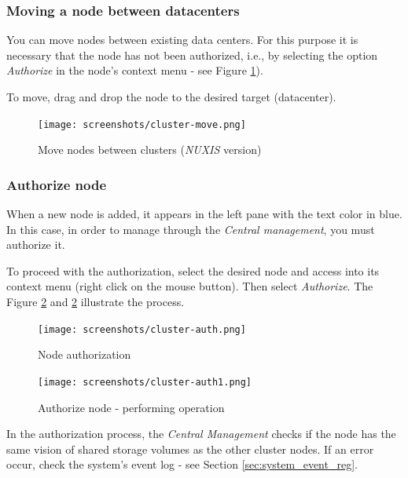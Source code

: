 {\subsubsection{Moving a node between datacenters}
You can move nodes between existing data centers. For this purpose it is necessary that the node has not been authorized, i.e., by selecting the option \emph{Authorize} in the node's context menu - see Figure \ref{fig:cluster-move}).

To move, drag and drop the node to the desired target (datacenter).
\begin{figure}[H]
        \begin{center}
        \texttt{[image: screenshots/cluster-move.png]}
        \caption{Move nodes between clusters (\emph{NUXIS} version)}
        \label{fig:cluster-move}
        \end{center}
\end{figure}

\subsubsection{Authorize node}
When a new node is added, it appears in the left pane with the text color in blue. In this case, in order to manage through the \textit{Central management}, you must authorize it.

To proceed with the authorization, select the desired node and access into its context menu (right click on the mouse button). Then select \textit{Authorize}. The Figure \ref{fig:cluster-auth} and \ref{fig:cluster-auth} illustrate the process.

\begin{figure}[H]
        \begin{center}
        \texttt{[image: screenshots/cluster-auth.png]}
        \caption{Node authorization}
        \label{fig:cluster-auth}
        \end{center}
\end{figure}

\begin{figure}[H]
        \begin{center}
        \texttt{[image: screenshots/cluster-auth1.png]}
        \caption{Authorize node - performing operation}
        \label{fig:cluster-auth1}
        \end{center}
\end{figure}
In the authorization process, the \textit{Central Management} checks if the node has the same vision of shared storage volumes as the other cluster nodes. If an error occur, check the system's event log - see Section \ref{sec:system_event_reg}.
}%

